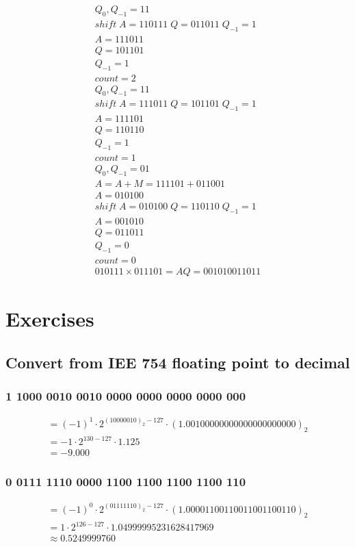 \documentclass[12pt, a4paper]{article}
\begin{document}
				\begin{align*}
					Q_0,Q_{-1}=11\\
					shift\; A=110111\; Q=011011\; Q_{-1}=1\\
					A=111011\\
					Q=101101\\
					Q_{-1}=1\\
					count=2\\[4mm]
					Q_0,Q_{-1}=11\\
					shift\; A=111011\; Q=101101\; Q_{-1}=1\\
					A=111101\\
					Q=110110\\
					Q_{-1}=1\\
					count=1\\[4mm]
					Q_0,Q_{-1}=01\\
					A=A+M=111101+011001\\
					A=010100\\
					shift\; A=010100\; Q=110110\; Q_{-1}=1\\
					A=001010\\
					Q=011011\\
					Q_{-1}=0\\
					count=0\\[4mm]
					010111\times 011101 = AQ=001010011011
					\end{align*}
	\section{Exercises}
		\subsection{Convert from IEE 754 floating point to decimal}
			\subsubsection{1 1000 0010 0010 0000 0000 0000 0000 000}
				\begin{align*}  
				=(-1)^1\cdot 2^{(1000 0010)_2-127}\cdot (1.0010 0000 0000 0000 0000 000)_2\\
				=-1\cdot 2^{130-127}\cdot 1.125\\
				=-9.000
				\end{align*}
			\subsubsection{0 0111 1110 0000 1100 1100 1100 1100 110}
				\begin{align*}  
				=(-1)^0\cdot 2^{(0111 1110)_2-127}\cdot (1.0000 1100 1100 1100 1100 110)_2\\
				=1\cdot 2^{126-127}\cdot 1.04999995231628417969\\
				\approx 0.5249999760
				\end{align*}
\end{document}

